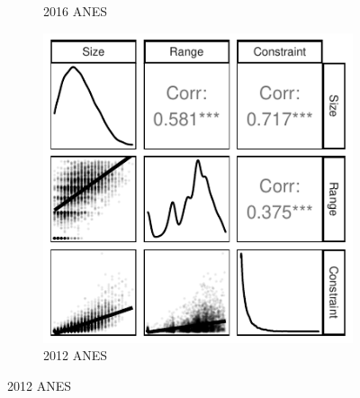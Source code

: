\documentclass[12pt]{article}
\begin{document}
\begin{figure}[h]
\begin{subfigure}[h]{0.27\textwidth}
		\caption{2016 ANES}
	\end{subfigure}%
	\begin{subfigure}[h]{0.27\textwidth}
		\centering
		\includegraphics[width=\textwidth]{../out/appB4e-anes2012_components.pdf}
		\caption{2012 ANES}
	\end{subfigure}%
	

\end{figure}
\end{document}
